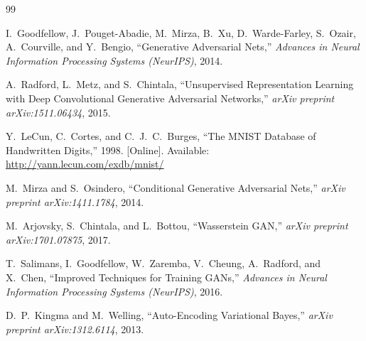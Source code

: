 \documentclass[12pt,a4paper]{article}
\begin{document}
\begin{thebibliography}{99}

I.\ Goodfellow, J.\ Pouget-Abadie, M.\ Mirza, B.\ Xu, D.\ Warde-Farley, S.\ Ozair,
A.\ Courville, and Y.\ Bengio,
``Generative Adversarial Nets,''
\textit{Advances in Neural Information Processing Systems (NeurIPS)}, 2014.

A.\ Radford, L.\ Metz, and S.\ Chintala,
``Unsupervised Representation Learning with Deep Convolutional Generative Adversarial Networks,''
\textit{arXiv preprint arXiv:1511.06434}, 2015.

Y.\ LeCun, C.\ Cortes, and C.\ J.\ C.\ Burges,
``The MNIST Database of Handwritten Digits,''
1998. [Online]. Available: \url{http://yann.lecun.com/exdb/mnist/}

M.\ Mirza and S.\ Osindero,
``Conditional Generative Adversarial Nets,''
\textit{arXiv preprint arXiv:1411.1784}, 2014.

M.\ Arjovsky, S.\ Chintala, and L.\ Bottou,
``Wasserstein GAN,''
\textit{arXiv preprint arXiv:1701.07875}, 2017.

T.\ Salimans, I.\ Goodfellow, W.\ Zaremba, V.\ Cheung, A.\ Radford, and X.\ Chen,
``Improved Techniques for Training GANs,''
\textit{Advances in Neural Information Processing Systems (NeurIPS)}, 2016.

D.\ P.\ Kingma and M.\ Welling,
``Auto-Encoding Variational Bayes,''
\textit{arXiv preprint arXiv:1312.6114}, 2013.

\end{thebibliography}
\end{document}

